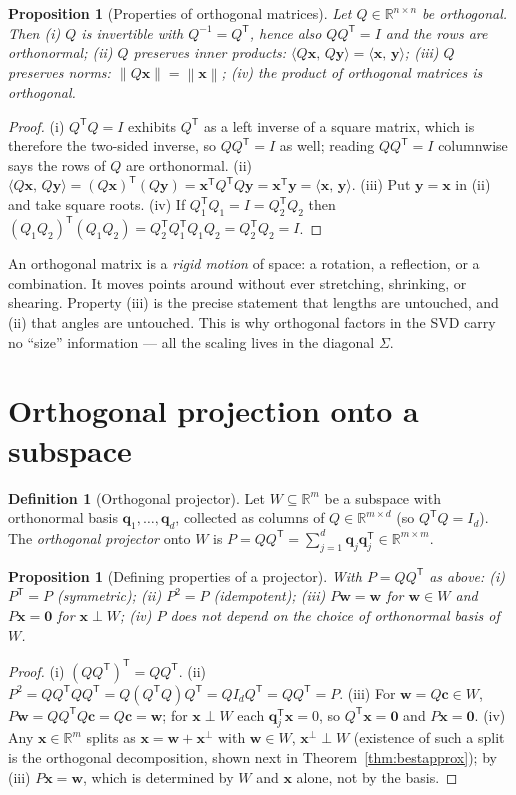 \documentclass[11pt,oneside]{book}
\theoremstyle{plain}
\newtheorem{proposition}[theorem]{Proposition}
\theoremstyle{definition}
\newtheorem{definition}[theorem]{Definition}
\theoremstyle{remark}
\newcommand{\R}{\mathbb{R}}
\newcommand{\norm}[1]{\left\lVert #1 \right\rVert}
\newcommand{\T}{^{\mathsf T}}
\newcommand{\inv}{^{-1}}
\newcommand{\inner}[2]{\langle #1,\, #2\rangle}
\newcommand{\bw}{\mathbf{w}}
\newcommand{\bx}{\mathbf{x}}
\newcommand{\by}{\mathbf{y}}
\newcommand{\bq}{\mathbf{q}}
\newcommand{\bzero}{\mathbf{0}}
\begin{document}
\begin{proposition}[Properties of orthogonal matrices]\label{prop:Qprops}
Let $Q\in\R^{n\times n}$ be orthogonal. Then
\textup{(i)} $Q$ is invertible with $Q\inv=Q\T$, hence also $QQ\T=I$ and the rows are
orthonormal;
\textup{(ii)} $Q$ preserves inner products: $\inner{Q\bx}{Q\by}=\inner{\bx}{\by}$;
\textup{(iii)} $Q$ preserves norms: $\norm{Q\bx}=\norm{\bx}$;
\textup{(iv)} the product of orthogonal matrices is orthogonal.
\end{proposition}
\begin{proof}
(i) $Q\T Q=I$ exhibits $Q\T$ as a left inverse of a square matrix, which is therefore
the two-sided inverse, so $QQ\T=I$ as well; reading $QQ\T=I$ columnwise says the rows of
$Q$ are orthonormal. (ii) $\inner{Q\bx}{Q\by}=(Q\bx)\T(Q\by)=\bx\T Q\T Q\by=\bx\T\by
=\inner{\bx}{\by}$. (iii) Put $\by=\bx$ in (ii) and take square roots. (iv) If
$Q_1\T Q_1=I=Q_2\T Q_2$ then $(Q_1Q_2)\T(Q_1Q_2)=Q_2\T Q_1\T Q_1Q_2=Q_2\T Q_2=I$.
\end{proof}

\begin{geometry_box}
An orthogonal matrix is a \emph{rigid motion} of space: a rotation, a reflection, or a
combination. It moves points around without ever stretching, shrinking, or shearing.
Property (iii) is the precise statement that lengths are untouched, and (ii) that angles
are untouched. This is why orthogonal factors in the SVD carry no ``size'' information ---
all the scaling lives in the diagonal $\Sigma$.
\end{geometry_box}

\section{Orthogonal projection onto a subspace}

\begin{definition}[Orthogonal projector]
Let $W\subseteq\R^m$ be a subspace with orthonormal basis $\bq_1,\dots,\bq_d$, collected
as columns of $Q\in\R^{m\times d}$ (so $Q\T Q=I_d$). The \emph{orthogonal projector}
onto $W$ is $P=QQ\T=\sum_{j=1}^d\bq_j\bq_j\T\in\R^{m\times m}$.
\end{definition}

\begin{proposition}[Defining properties of a projector]\label{prop:projprops}
With $P=QQ\T$ as above: \textup{(i)} $P\T=P$ (symmetric); \textup{(ii)} $P^2=P$
(idempotent); \textup{(iii)} $P\bw=\bw$ for $\bw\in W$ and $P\bx=\bzero$ for
$\bx\perp W$; \textup{(iv)} $P$ does not depend on the choice of orthonormal basis of
$W$.
\end{proposition}
\begin{proof}
(i) $(QQ\T)\T=QQ\T$. (ii) $P^2=QQ\T QQ\T=Q(Q\T Q)Q\T=QI_dQ\T=QQ\T=P$. (iii) For
$\bw=Q\mathbf{c}\in W$, $P\bw=QQ\T Q\mathbf{c}=Q\mathbf{c}=\bw$; for $\bx\perp W$ each
$\bq_j\T\bx=0$, so $Q\T\bx=\bzero$ and $P\bx=\bzero$. (iv) Any $\bx\in\R^m$ splits as
$\bx=\bw+\bx^\perp$ with $\bw\in W$, $\bx^\perp\perp W$ (existence of such a split is the
orthogonal decomposition, shown next in Theorem~\ref{thm:bestapprox}); by (iii)
$P\bx=\bw$, which is determined by $W$ and $\bx$ alone, not by the basis.
\end{proof}
\end{document}
